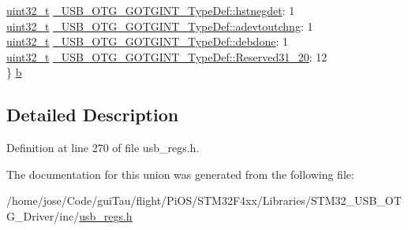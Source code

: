\begin{DoxyCompactItemize}
\begin{tabbing}
\>\hyperlink{stdint_8h_a435d1572bf3f880d55459d9805097f62}{uint32\_t} \hyperlink{group___u_s_b___o_t_g___d_r_i_v_e_r_ga31938c28140ff521cead9f6178569b80}{\_USB\_OTG\_GOTGINT\_TypeDef::hstnegdet}: 1\\
\>\hyperlink{stdint_8h_a435d1572bf3f880d55459d9805097f62}{uint32\_t} \hyperlink{group___u_s_b___o_t_g___d_r_i_v_e_r_ga39bad2c1d3b0fda34c485f0f40e06619}{\_USB\_OTG\_GOTGINT\_TypeDef::adevtoutchng}: 1\\
\>\hyperlink{stdint_8h_a435d1572bf3f880d55459d9805097f62}{uint32\_t} \hyperlink{group___u_s_b___o_t_g___d_r_i_v_e_r_gab634dbc7a75e92711261edb16b3c3d7d}{\_USB\_OTG\_GOTGINT\_TypeDef::debdone}: 1\\
\>\hyperlink{stdint_8h_a435d1572bf3f880d55459d9805097f62}{uint32\_t} \hyperlink{group___u_s_b___o_t_g___d_r_i_v_e_r_gab48b8fbd939a2b311335643ef6020ab7}{\_USB\_OTG\_GOTGINT\_TypeDef::Reserved31\_20}: 12\\
\} \hyperlink{group___u_s_b___o_t_g___d_r_i_v_e_r_ga4fa69adf57a104a19ca77b625595a361}{b}\\

\end{tabbing}\end{DoxyCompactItemize}


\subsection{Detailed Description}


Definition at line 270 of file usb\-\_\-regs.\-h.



The documentation for this union was generated from the following file\-:\begin{DoxyCompactItemize}
\item 
/home/jose/\-Code/gui\-Tau/flight/\-Pi\-O\-S/\-S\-T\-M32\-F4xx/\-Libraries/\-S\-T\-M32\-\_\-\-U\-S\-B\-\_\-\-O\-T\-G\-\_\-\-Driver/inc/\hyperlink{_s_t_m32_f4xx_2_libraries_2_s_t_m32___u_s_b___o_t_g___driver_2inc_2usb__regs_8h}{usb\-\_\-regs.\-h}\end{DoxyCompactItemize}
